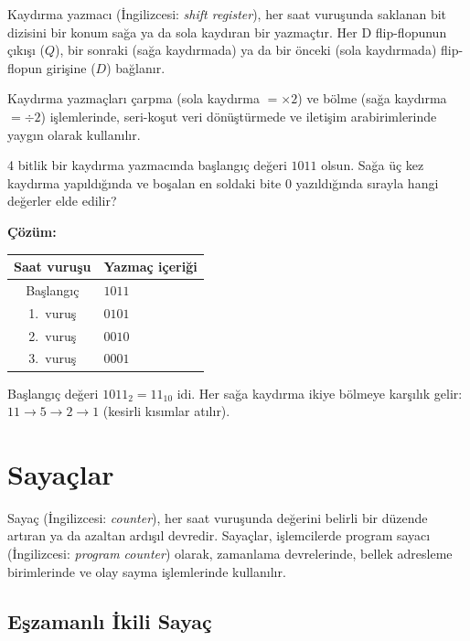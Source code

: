 Kaydırma yazmacı (İngilizcesi: \textit{shift register}), her saat vuruşunda saklanan bit dizisini bir konum sağa ya da sola kaydıran bir yazmaçtır. Her D flip-flopunun çıkışı ($Q$), bir sonraki (sağa kaydırmada) ya da bir önceki (sola kaydırmada) flip-flopun girişine ($D$) bağlanır.

Kaydırma yazmaçları çarpma (sola kaydırma $= \times 2$) ve bölme (sağa kaydırma $= \div 2$) işlemlerinde, seri-koşut veri dönüştürmede ve iletişim arabirimlerinde yaygın olarak kullanılır.

\begin{ornek}[B.5]
4 bitlik bir kaydırma yazmacında başlangıç değeri $1011$ olsun. Sağa üç kez kaydırma yapıldığında ve boşalan en soldaki bite 0 yazıldığında sırayla hangi değerler elde edilir?

\textbf{Çözüm:}

\begin{table}[H]
\centering
\begin{tabular}{cl}
\toprule
\textbf{Saat vuruşu} & \textbf{Yazmaç içeriği} \\
\midrule
Başlangıç & $1011$ \\
1.~vuruş   & $0101$ \\
2.~vuruş   & $0010$ \\
3.~vuruş   & $0001$ \\
\bottomrule
\end{tabular}
\end{table}

Başlangıç değeri $1011_2 = 11_{10}$ idi. Her sağa kaydırma ikiye bölmeye karşılık gelir: $11 \to 5 \to 2 \to 1$ (kesirli kısımlar atılır).
\end{ornek}


\section{Sayaçlar}
\label{sec:sayaclar}

Sayaç (İngilizcesi: \textit{counter}), her saat vuruşunda değerini belirli bir düzende artıran ya da azaltan ardışıl devredir. Sayaçlar, işlemcilerde program sayacı (İngilizcesi: \textit{program counter}) olarak, zamanlama devrelerinde, bellek adresleme birimlerinde ve olay sayma işlemlerinde kullanılır.

\subsection{Eşzamanlı İkili Sayaç}

